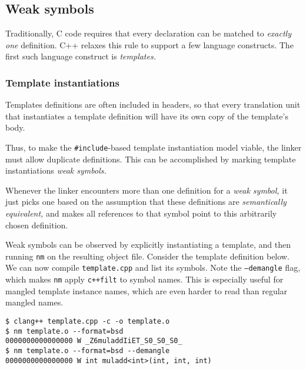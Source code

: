 \documentclass[12pt,a4paper]{article}
\newcommand{\C}{C}
\newcommand{\Cpp}{C++}
\newcommand{\listobjsymbols}{\texttt{nm}}
\newcommand{\Cppfilt}{\texttt{c++filt}}
\newcommand{\filename}[1]{\texttt{#1}}
\begin{document}
\subsection{Weak symbols}

Traditionally, \C{} code requires that every declaration can be matched to \emph{exactly one} definition. \Cpp{} relaxes this rule to support a few language constructs. The first such language construct is \emph{templates.} 

\subsubsection{Template instantiations}

Templates definitions are often included in headers, so that every translation unit that instantiates a template definition will have its own copy of the template's body. 

Thus, to make the \texttt{\#include}-based template instantiation model viable, the linker must allow duplicate definitions. This can be accomplished by marking template instantiations \emph{weak symbols.} 

Whenever the linker encounters more than one definition for a \emph{weak symbol,} it just picks one based on the assumption that these definitions are \emph{semantically equivalent,} and makes all references to that symbol point to this arbitrarily chosen definition.

Weak symbols can be observed by explicitly instantiating a template, and then running \listobjsymbols{} on the resulting object file. Consider the template definition below.\\



We can now compile \filename{template.cpp} and list its symbols. Note the \texttt{--demangle} flag, which makes \listobjsymbols{} apply \Cppfilt{} to symbol names. This is especially useful for mangled template instance names, which are even harder to read than regular mangled names.\\

\begin{lstlisting}[caption=compiling and listing all symbol names in \filename{template.o}]
$ clang++ template.cpp -c -o template.o
$ nm template.o --format=bsd
0000000000000000 W _Z6muladdIiET_S0_S0_S0_
$ nm template.o --format=bsd --demangle
0000000000000000 W int muladd<int>(int, int, int)
\end{lstlisting}
\end{document}
